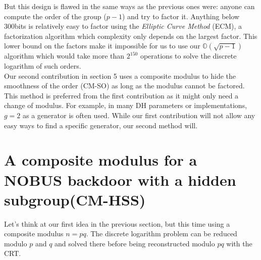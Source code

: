 \documentclass[a4paper,11pt,twocolumn]{article}
\begin{document}
But this design is flawed in the same ways as the previous ones were: anyone can compute the order of the group ($p - 1$) and try to factor it. Anything below 300bits is relatively easy to factor using the \emph{Elliptic Curve Method} (ECM), a factorization algorithm which complexity only depends on the largest factor. This lower bound on the factors make it impossible for us to use our $\mathbb{O}(\sqrt{p-1})$ algorithm which would take more than $2^{150}$ operations to solve the discrete logarithm of such orders. \\

Our second contribution in section 5 uses a composite modulus to hide the smoothness of the order (CM-SO) as long as the modulus cannot be factored. This method is preferred from the first contribution as it might only need a change of modulus. For example, in many DH parameters or implementations, $g=2$ as a generator is often used. While our first contribution will not allow any easy ways to find a specific generator, our second method will.

\section{A composite modulus for a NOBUS backdoor with a hidden subgroup(CM-HSS)}

Let's think at our first idea in the previous section, but this time using a composite modulus $n=pq$. The discrete logarithm problem can be reduced modulo $p$ and $q$ and solved there before being reconstructed modulo $pq$ with the CRT.

\begin{center}
\end{center}
\end{document}
